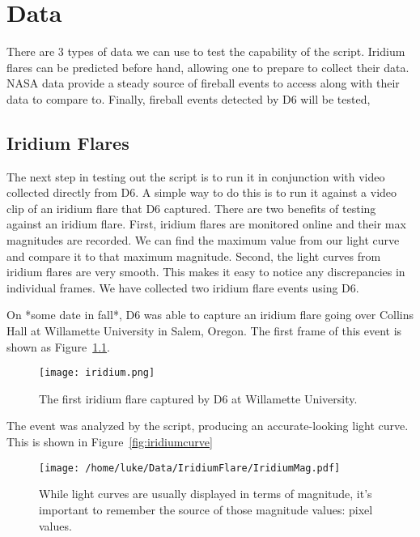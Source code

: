 \chapter{Data}

There are 3 types of data we can use to test the capability of the script. Iridium flares can be predicted before hand, allowing one to prepare to collect their data. NASA data provide a steady source of fireball events to access along with their data to compare to. Finally, fireball events detected by D6 will be tested, 

\section{Iridium Flares}

The next step in testing out the script is to run it in conjunction with video collected directly from D6. A simple way to do this is to run it against a video clip of an iridium flare that D6 captured. There are two benefits of testing against an iridium flare. First, iridium flares are monitored online and their max magnitudes are recorded. We can find the maximum value from our light curve and compare it to that maximum magnitude. Second, the light curves from iridium flares are very smooth. This makes it easy to notice any discrepancies in individual frames. We have collected two iridium flare events using D6. 

On *some date in fall*, D6 was able to capture an iridium flare going over Collins Hall at Willamette University in Salem, Oregon. The first frame of this event is shown as Figure~\ref{fig:iridium}. 

\begin{figure}[ht!]
	\centering
	\texttt{[image: iridium.png]}
	\caption{The first iridium flare captured by D6 at Willamette University.}
	\label{fig:iridium}
\end{figure}

The event was analyzed by the script, producing an accurate-looking light curve. This is shown in Figure~\ref{fig:iridiumcurve}

\begin{figure}[ht!]
	\centering
	\texttt{[image: /home/luke/Data/IridiumFlare/IridiumMag.pdf]}
	\caption{While light curves are usually displayed in terms of magnitude, it's important to remember the source of those magnitude values: pixel values.}
	\label{fig:iridiummag}
\end{figure}

